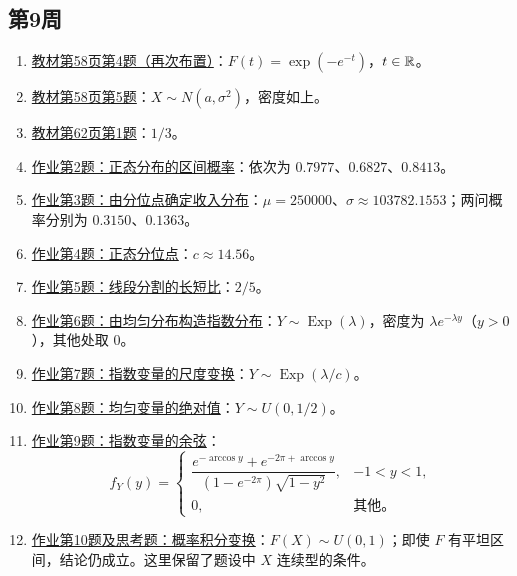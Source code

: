 \subsection*{第9周}
\begin{enumerate}
\item \hyperref[ex:w09-b58-4]{教材第58页第4题（再次布置）}：$F(t)=\exp(-e^{-t})$，$t\in\mathbb R$。
\item \hyperref[ex:w09-b58-5]{教材第58页第5题}：$X\sim N(a,\sigma^2)$，密度如上。
\item \hyperref[ex:w09-b62-1]{教材第62页第1题}：$1/3$。
\item \hyperref[ex:w09-h2]{作业第2题：正态分布的区间概率}：依次为 $0.7977$、$0.6827$、$0.8413$。
\item \hyperref[ex:w09-h3]{作业第3题：由分位点确定收入分布}：$\mu=250000$、$\sigma\approx103782.1553$；两问概率分别为 $0.3150$、$0.1363$。
\item \hyperref[ex:w09-h4]{作业第4题：正态分位点}：$c\approx14.56$。
\item \hyperref[ex:w09-h5]{作业第5题：线段分割的长短比}：$2/5$。
\item \hyperref[ex:w09-h6]{作业第6题：由均匀分布构造指数分布}：$Y\sim\operatorname{Exp}(\lambda)$，密度为 $\lambda e^{-\lambda y}$（$y>0$），其他处取 $0$。
\item \hyperref[ex:w09-h7]{作业第7题：指数变量的尺度变换}：$Y\sim\operatorname{Exp}(\lambda/c)$。
\item \hyperref[ex:w09-h8]{作业第8题：均匀变量的绝对值}：$Y\sim U(0,1/2)$。
\item \hyperref[ex:w09-h9]{作业第9题：指数变量的余弦}：\[
f_Y(y)=\begin{cases}
\dfrac{e^{-\arccos y}+e^{-2\pi+\arccos y}}
{(1-e^{-2\pi})\sqrt{1-y^2}},&-1<y<1,\\[6pt]
0,&\text{其他。}
\end{cases}
\]
\item \hyperref[ex:w09-h10]{作业第10题及思考题：概率积分变换}：$F(X)\sim U(0,1)$；即使 $F$ 有平坦区间，结论仍成立。这里保留了题设中 $X$ 连续型的条件。
\end{enumerate}

